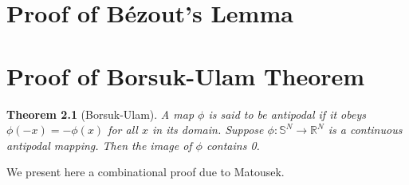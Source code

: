 \documentclass[a4paper,11pt]{report}
\renewcommand*\contentsname{Table of Contents}
\newtheorem{theorem}{Theorem}[section]
\theoremstyle{definition}
\newcommand{\RR}{\mathbb R}
\newcommand{\SP}{\mathbb S}
\newcommand{\1}[1]{\mathds{1}_{[#1]}}
\begin{document}



\clearpage

    



\setcounter{page}{1}

%

\clearpage
{}
\tableofcontents
\renewcommand{\contentsname}{Table of Contents}

\clearpage
{}
{}
\listoffigures




\clearpage
{}
\setcounter{page}{1}

\renewcommand\bibname{References}

\clearpage
{}
















\clearpage
\appendix 


\chapter{Proof of Bézout's Lemma}
\chapter{Proof of Borsuk-Ulam Theorem}
    \begin{theorem}[Borsuk-Ulam]
        A map $\phi$ is said to be antipodal if it obeys $\phi (-x) = -\phi(x)$ for all $x$ in its domain. Suppose $\phi: \SP^N \to \RR^N$ is a continuous antipodal mapping. 
        Then the image of $\phi$ contains 0. \label{thm:Borsuk-Ulam}
    \end{theorem}
We present here a combinational proof due to Matousek.\cite{matouvsek2003using} 
\end{document}
